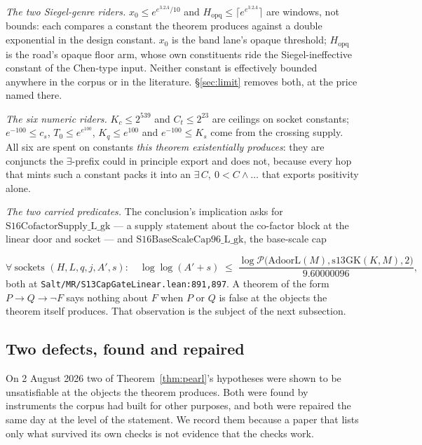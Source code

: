 \documentclass[11pt]{amsart}
\newcommand{\leaninline}[1]{{\small\texttt{#1}}}
\theoremstyle{remark}
\begin{document}
\emph{The two Siegel-genre riders.} $x_0 \le e^{e^{3.2A}/10}$ and
$H_{\mathrm{opq}} \le \lceil e^{e^{3.2A}}\rceil$ are windows, not bounds: each
compares a constant the theorem produces against a double exponential in the
design constant. $x_0$ is the band lane's opaque threshold; $H_{\mathrm{opq}}$
is the road's opaque floor arm, whose own constituents ride the
Siegel-ineffective constant of the Chen-type input. Neither constant is
effectively bounded anywhere in the corpus or in the literature.
\S\ref{sec:limit} removes both, at the price named there.

\emph{The six numeric riders.} $K_c \le 2^{539}$ and $C_t \le 2^{23}$ are
ceilings on socket constants; $e^{-100} \le c_s$, $T_0 \le e^{e^{100}}$,
$K_q \le e^{100}$ and $e^{-100} \le K_s$ come from the crossing supply. All six
are spent on constants \emph{this theorem existentially produces}: they are
conjuncts the $\exists$-prefix could in principle export and does not, because
every hop that mints such a constant packs it into an
$\exists\,C,\ 0 < C \wedge \ldots$ that exports positivity alone.

{\sloppy
\emph{The two carried predicates.} The conclusion's implication asks for
$\mathrm{S16CofactorSupply\_L\_gk}$ --- a supply statement about the co-factor
block at the linear door and socket --- and
$\mathrm{S16BaseScaleCap96\_L\_gk}$, the base-scale cap\par}
\[
\forall\ \text{sockets } (H,L,q,j,A',s):\quad
\log\log(A'+s) \;\le\;
\frac{\log \mathcal{P}\bigl(\mathrm{AdoorL}(M), \mathrm{s13GK}(K,M), 2\bigr)}
     {9.60000096} ,
\]
both at \leaninline{Salt/MR/S13CapGateLinear.lean:891,897}. A theorem of the
form $P \to Q \to \lnot F$ says nothing about $F$ when $P$ or $Q$ is false at
the objects the theorem itself produces. That observation is the subject of the
next subsection.

\subsection{Two defects, found and repaired}\label{sec:pearl-defects}
On 2 August 2026 two of Theorem~\ref{thm:pearl}'s hypotheses were shown to be
unsatisfiable at the objects the theorem produces. Both were found by
instruments the corpus had built for other purposes, and both were repaired the
same day at the level of the statement. We record them because a paper that
lists only what survived its own checks is not evidence that the checks work.
\end{document}
